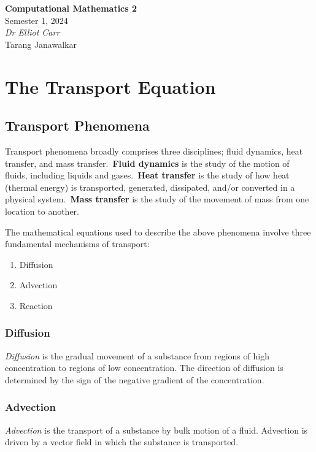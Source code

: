 \documentclass{article}
\date{}
\newcommand{\unitName}{Computational Mathematics 2}
\newcommand{\unitTime}{Semester 1, 2024}
\newcommand{\unitCoordinator}{Dr Elliot Carr}
\newcommand{\documentAuthors}{Tarang Janawalkar}
\begin{document}
%
\begin{titlepage}
    \vspace*{\fill}
    \begin{center}
        \LARGE{\textbf{\unitName}} \\[0.1in]
        \normalsize{\unitTime} \\[0.2in]
        \normalsize\textit{\unitCoordinator} \\[0.2in]
        \documentAuthors
    \end{center}
    \vspace*{\fill}
    \doclicenseThis
    \thispagestyle{empty}
\end{titlepage}
\newpage
%
\tableofcontents
\newpage
%
\section{The Transport Equation}
\subsection{Transport Phenomena}
Transport phenomena broadly comprises three disciplines; fluid
dynamics, heat transfer, and mass transfer.\ \textbf{Fluid dynamics} is
the study of the motion of fluids, including liquids and gases.\
\textbf{Heat transfer} is the study of how heat (thermal energy) is
transported, generated, dissipated, and/or converted in a physical
system.\ \textbf{Mass transfer} is the study of the movement of mass
from one location to another.

The mathematical equations used to describe the above phenomena involve
three fundamental mechanisms of transport:
\begin{enumerate}
    \item Diffusion
    \item Advection
    \item Reaction
\end{enumerate}
\subsubsection{Diffusion}
\textit{Diffusion} is the gradual movement of a substance from regions of high
concentration to regions of low concentration. The direction of
diffusion is determined by the sign of the negative gradient of the
concentration.
\subsubsection{Advection}
\textit{Advection} is the transport of a substance by bulk motion of a fluid.
Advection is driven by a vector field in which the substance is
transported.
\end{document}
